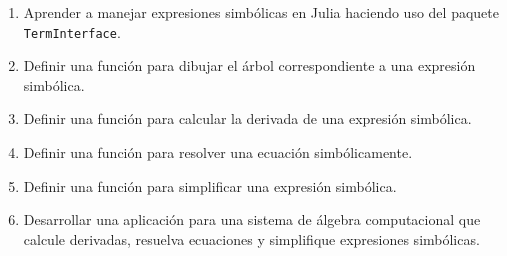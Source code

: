 \documentclass[
  a4paper,
]{scrreport}
\providecommand{\tightlist}{%
  \setlength{\itemsep}{0pt}\setlength{\parskip}{0pt}}\usepackage{longtable,booktabs,array}
\begin{document}
\begin{enumerate}
\def\labelenumi{\arabic{enumi}.}
\tightlist
\item
  Aprender a manejar expresiones simbólicas en Julia haciendo uso del
  paquete \texttt{TermInterface}.
\item
  Definir una función para dibujar el árbol correspondiente a una
  expresión simbólica.
\item
  Definir una función para calcular la derivada de una expresión
  simbólica.
\item
  Definir una función para resolver una ecuación simbólicamente.
\item
  Definir una función para simplificar una expresión simbólica.
\item
  Desarrollar una aplicación para una sistema de álgebra computacional
  que calcule derivadas, resuelva ecuaciones y simplifique expresiones
  simbólicas.
\end{enumerate}
\end{document}
